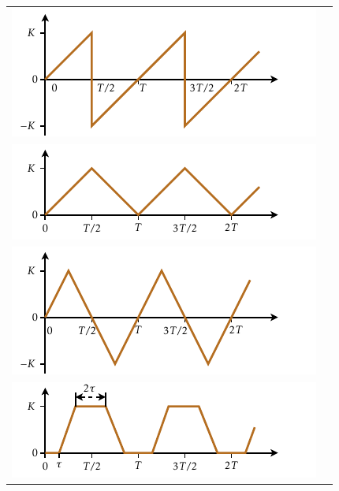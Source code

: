 \begin{longtable}{cc}
   \includegraphics{Imatges/Cap-Fourier-Funcio-8.pdf} & \raisebox{1.2cm}{$\displaystyle \frac{{2K}}{\piup }\sum\limits_{n = 1}^\infty  {\frac{{( - 1)^{n+1} \sin (n\omega t)}}{n}}$}\\[2.4ex]
   \includegraphics{Imatges/Cap-Fourier-Funcio-9.pdf} & \raisebox{0.8cm}{$\displaystyle\frac{K}{2} - \frac{{4K}}{{\piup ^2 }}\sum\limits_{n = 1}^\infty  {\frac{{\cos \big((2n - 1)\omega t\big)}}{{(2n - 1)^2 }}}$}\\[2.4ex]
   \includegraphics{Imatges/Cap-Fourier-Funcio-10.pdf} & \raisebox{1.2cm}{$\displaystyle\frac{{8K}}{{\piup ^2 }}\sum\limits_{n = 1}^\infty  {\frac{{( - 1)^{n-1} \sin \big((2n - 1)\omega t\big)}}{{(2n - 1)^2 }}}$}\\[2.4ex]
   \includegraphics{Imatges/Cap-Fourier-Funcio-11.pdf} & \raisebox{0.8cm}{$\displaystyle\frac{K}{2} - \frac{{4K}}{{\piup ^2  - 2\piup \omega \tau }}\sum\limits_{n = 1}^\infty  {\frac{{\cos \big((2n-1)\omega \tau \big)\cos \big((2n-1)\omega t\big)}}{{(2n - 1)^2 }}}$}\\[2.4ex]

\end{longtable}
